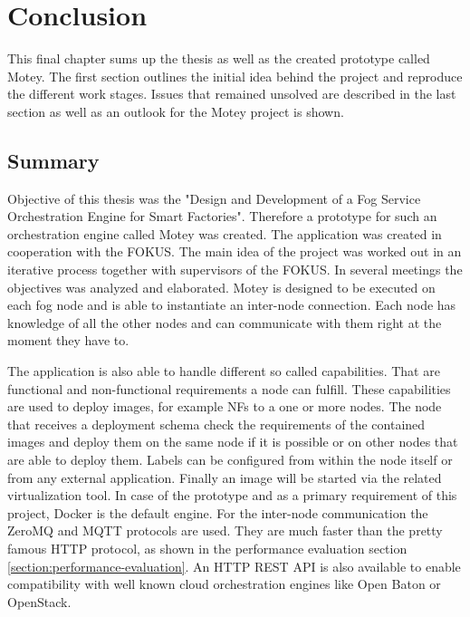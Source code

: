 \chapter{Conclusion}
\label{chapter:conclusion}
\minitoc\vspace{.5cm}
This final chapter sums up the thesis as well as the created prototype called Motey.
The first section outlines the initial idea behind the project and reproduce the different work stages.
Issues that remained unsolved are described in the last section as well as an outlook for the Motey project is shown.

\section{Summary}
Objective of this thesis was the "Design and Development of a Fog Service Orchestration Engine for Smart Factories".
Therefore a prototype for such an orchestration engine called Motey was created.
The application was created in cooperation with the \acf{FOKUS}.
The main idea of the project was worked out in an iterative process together with supervisors of the \ac{FOKUS}.
In several meetings the objectives was analyzed and elaborated.
Motey is designed to be executed on each fog node and is able to instantiate an inter-node connection.
Each node has knowledge of all the other nodes and can communicate with them right at the moment they have to.\newline

The application is also able to handle different so called capabilities.
That are functional and non-functional requirements a node can fulfill.
These capabilities are used to deploy images, for example \acp{NF} to a one or more nodes.
The node that receives a deployment schema check the requirements of the contained images and deploy them on the same node if it is possible or on other nodes that are able to deploy them.
Labels can be configured from within the node itself or from any external application.
Finally an image will be started via the related virtualization tool.
In case of the prototype and as a primary requirement of this project, Docker is the default engine.
For the inter-node communication the ZeroMQ and \ac{MQTT} protocols are used.
They are much faster than the pretty famous \ac{HTTP} protocol, as shown in the performance evaluation section \ref{section:performance-evaluation}.
An \ac{HTTP} \ac{REST} \ac{API} is also available to enable compatibility with well known cloud orchestration engines like Open Baton or OpenStack.

